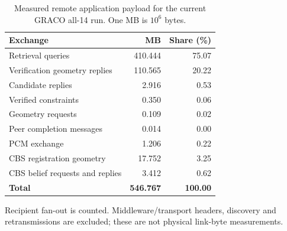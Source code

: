 \begin{table}[htbp]
\centering\small
\caption{Measured remote application payload for the current GRACO all-14 run. One MB is $10^6$ bytes.}
\label{tab:traffic}
\begin{tabular}{lrr}
\toprule
Exchange & MB & Share (\%) \\
\midrule
Retrieval queries & 410.444 & 75.07 \\
Verification geometry replies & 110.565 & 20.22 \\
Candidate replies & 2.916 & 0.53 \\
Verified constraints & 0.350 & 0.06 \\
Geometry requests & 0.109 & 0.02 \\
Peer completion messages & 0.014 & 0.00 \\
PCM exchange & 1.206 & 0.22 \\
CBS registration geometry & 17.752 & 3.25 \\
CBS belief requests and replies & 3.412 & 0.62 \\
\textbf{Total} & \textbf{546.767} & \textbf{100.00} \\
\bottomrule
\end{tabular}
\par\vspace{5pt}\begin{minipage}{0.97\linewidth}\footnotesize Recipient fan-out is counted. Middleware/transport headers, discovery and retransmissions are excluded; these are not physical link-byte measurements.\end{minipage}
\end{table}
